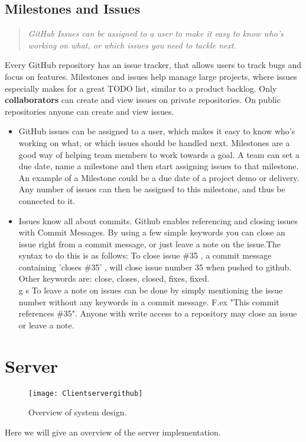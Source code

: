 \subsection{Milestones and Issues}
\begin{quote}
\em GitHub Issues can be assigned to a user to make it easy to know who's working on what, or which issues you need to tackle next.
\end{quote}
Every GitHub repository has an issue tracker, that allows users to track bugs and focus on features. Milestones and issues help manage large projects, where issues especially makes for a great TODO list, similar to a product backlog. Only {\bf collaborators} can create and view issues on private repositories. On public repositories anyone can create and view issues. 
\begin{itemize}
\item GitHub issues can be assigned to a user, which makes it easy to know who's working on what, or which issues should be handled next. Milestones are a good way of helping team members to work towards a goal. A team can set a due date, name a milestone and then start assigning issues to that milestone. An example of a Milestone could be a due date of a project demo or delivery. Any number of issues can then be assigned to this milestone, and thus be connected to it. 
\item Issues know all about commits. Github enables referencing and closing issues with Commit Messages. By using a few simple keywords you can close an issue right from a commit message, or just leave a note on the issue.The syntax to do this is as follows: To close issue \#35 , a commit message containing 'closes \#35' , will close issue number 35 when pushed to github. Other keywords are: close, closes, closed, fixes, fixed. \\g s
To leave a note on issues can be done by simply mentioning the issue number without any keywords in a commit message. F.ex "This commit references \#35". Anyone with write access to a repository may close an issue or leave a note.
\end{itemize}

\section{Server}
\begin{figure}[h!]
\centering
    \texttt{[image: Clientservergithub]}
\caption{Overview of system design.}
\label{newnotification}
\end{figure}
Here we will give an overview of the server implementation.

